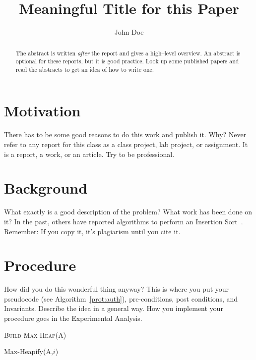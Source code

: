 \documentclass[onecolumn, 12pt, article]{IEEEtran}
\numberwithin{case}{problem}
\numberwithin{condition}{problem}
\numberwithin{condition}{subsection}
\numberwithin{definition}{section}
\theoremstyle{remark}
\numberwithin{question}{problem}
\theoremstyle{plain}
\numberwithin{answer}{problem}
\numberwithin{solution}{section}
\numberwithin{equation}{section}%
\begin{document}



\title{Meaningful Title for this Paper}
\author{John Doe}
\date{} %
\maketitle

\pagestyle{fancy} %

\begin{abstract}

The abstract is written \emph{after} the report and gives a high--level overview.  An abstract is optional for these reports, but it is good practice.  Look up some published papers and read the abstracts to get an idea of how to write one.

\end{abstract}
\section{Motivation}
There has to be some good reasons to do this work and publish it.  Why?  Never refer to any report for this class as a class project, lab project, or assignment.  It is a report, a work, or an article.  Try to be professional.

\section{Background}
What exactly is a good description of the problem?  What work has been done on it?  In the past, others have reported algorithms to perform an Insertion Sort~\cite{cormen2001introduction}.  Remember:  If you copy it, it's plagiarism until you cite it.

\section{Procedure}
How did you do this wonderful thing anyway?  This is where you put your pseudocode (see Algorithm~\ref{prot:auth}), pre-conditions, post conditions, and Invariants.  Describe the idea in a general way.  How you implement your procedure goes in the Experimental Analysis.
\begin{algorithm}
\caption {\textsc{Build-Max-Heap}(A)}
\label{prot:auth}

\begin{algorithmic}[1]
     \State  Max-Heapify(A,$ i$)
 \EndFor
{}
\EndProcedure
\end{algorithmic}

\end{algorithm}
\end{document}

